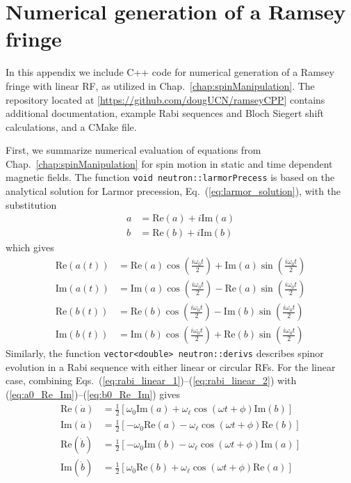 
\chapter{Numerical generation of a Ramsey fringe}\label{appx:ramsey_numerical}


In this appendix we include C++ code for numerical generation of a Ramsey fringe with linear RF, as utilized in Chap.~\ref{chap:spinManipulation}. The repository located at [\url{https://github.com/dougUCN/ramseyCPP}] contains additional documentation, example Rabi sequences and Bloch Siegert shift calculations, and a CMake file. 

First, we summarize numerical evaluation of equations from Chap.~\ref{chap:spinManipulation} for \ucn spin motion in static and time dependent magnetic fields. The function \texttt{void neutron::larmorPrecess} is based on the analytical solution for Larmor precession, Eq.~(\ref{eq:larmor_solution}), with the substitution
%
\begin{align}
    a &= \text{Re}(a)+i\text{Im}(a)\label{eq:a0_Re_Im}\\
    b &= \text{Re}(b)+i\text{Im}(b)\label{eq:b0_Re_Im}
\end{align}
%
which gives 
%
\begin{align}
    \text{Re}(a(t)) &= \text{Re}(a)\cos\left(\frac{i\omega_0 t}{2}\right)+\text{Im}(a)\sin\left(\frac{i\omega_0 t}{2}\right)\\
    \text{Im}(a(t)) &= \text{Im}(a)\cos\left(\frac{i\omega_0 t}{2}\right)-\text{Re}(a)\sin\left(\frac{i\omega_0 t}{2}\right)\\
    \text{Re}(b(t)) &= \text{Re}(b)\cos\left(\frac{i\omega_0 t}{2}\right)-\text{Im}(b)\sin\left(\frac{i\omega_0 t}{2}\right)\\
    \text{Im}(b(t)) &= \text{Im}(b)\cos\left(\frac{i\omega_0 t}{2}\right)+\text{Re}(b)\sin\left(\frac{i\omega_0 t}{2}\right)
\end{align}
%
Similarly, the function \texttt{vector<double> neutron::derivs} describes spinor evolution in a Rabi sequence with either linear or circular RFs. For the linear case, combining Eqs.~(\ref{eq:rabi_linear_1})--(\ref{eq:rabi_linear_2}) with (\ref{eq:a0_Re_Im})--(\ref{eq:b0_Re_Im}) gives
%
\begin{align}
    \text{Re}(\dot{a}) &= \frac{1}{2}\left[\omega_0\text{Im}(a) +\omega_\ell\cos(\omega t +\phi)\text{Im}(b) \right] \\
    \text{Im}(\dot{a}) &= \frac{1}{2}\left[-\omega_0\text{Re}(a)-\omega_\ell\cos(\omega t+\phi)\text{Re}(b) \right] \\
    \text{Re}(\dot{b}) &= \frac{1}{2}\left[-\omega_0\text{Im}(b)-\omega_\ell\cos(\omega t+\phi)\text{Im}(a) \right] \\
    \text{Im}(\dot{b}) &= \frac{1}{2}\left[\omega_0\text{Re}(b) +\omega_\ell\cos(\omega t +\phi)\text{Re}(a) \right]
\end{align}
